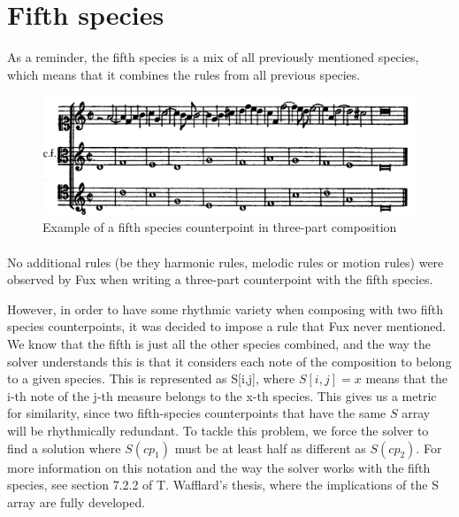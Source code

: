 \section{Fifth species}

As a reminder, the fifth species is a mix of all previously mentioned species, which means that it combines the rules from all previous species.

\begin{figure}[h]
    \centering
    \includegraphics[width=1\textwidth]{Images/Species_examples/5sp-example.png}
    \caption{Example of a fifth species counterpoint in three-part composition}
    \label{fig:example-5sp}
\end{figure}

\paragraph{}
No additional rules (be they harmonic rules, melodic rules or motion rules) were observed by Fux when writing a three-part counterpoint with the fifth species.


However, in order to have some rhythmic variety when composing with two fifth species counterpoints, it was decided to impose a rule that Fux never mentioned. We know that the fifth is just all the other species combined, and the way the solver understands this is that it considers each note of the composition to belong to a given species. This is represented as S[i,j], where $S[i,j]=x$ means that the i-th note of the j-th measure belongs to the x-th species. This gives us a metric for similarity, since two fifth-species counterpoints that have the same $S$ array will be rhythmically redundant. To tackle this problem, we force the solver to find a solution where $S(cp_1)$ must be at least half as different as $S(cp_2)$. For more information on this notation and the way the solver works with the fifth species, see section 7.2.2 of T. Wafflard's thesis, where the implications of the S array are fully developed. 

